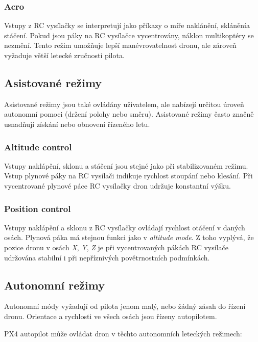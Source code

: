 \subsubsection{Acro}

Vstupy z RC vysílačky se interpretují jako příkazy o míře naklánění, sklánění\break a stáčení. Pokud jsou páky na RC vysílačce vycentrovány, náklon multikoptéry se nezmění. Tento režim umožňuje lepší manévrovatelnost dronu, ale zároveň vyžaduje větší letecké zručnosti pilota.

\subsection{Asistované režimy}

Asistované režimy jsou také ovládány uživatelem, ale nabízejí určitou úroveň autonomní pomoci (držení polohy nebo směru). Asistované režimy často značně usnadňují získání nebo obnovení řízeného letu.

\subsubsection{Altitude control}

Vstupy naklápění, sklonu a stáčení jsou stejné jako při stabilizovaném režimu. Vstup plynové páky na RC vysílači indikuje rychlost stoupání nebo klesání. Při vycentrované plynové páce RC vysílačky dron udržuje konstantní výšku.
        
\subsubsection{Position control}

Vstupy naklápění a sklonu z RC vysílačky ovládají rychlost  otáčení v daných osách. Plynová páka má stejnou funkci jako v \textit{altitude mode}. Z toho vyplývá, že pozice dronu v osách \textit{X}, \textit{Y}, \textit{Z} je při vycentrovaných pákách RC vysílače udržována stabilní i při nepříznivých povětrnostních podmínkách.

\subsection{Autonomní režimy}

Autonomní módy vyžadují od pilota jenom malý, nebo žádný zásah do řízení dronu. Orientace a rychlosti ve všech osách jsou řízeny autopilotem.

PX4 autopilot může ovládat dron v těchto autonomních leteckých režimech: \cite{PX4docs}

